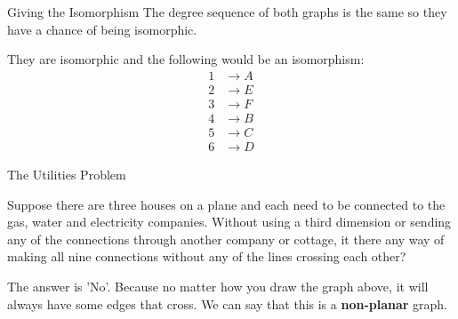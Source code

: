 \documentclass[8pt]{beamer}
\begin{document}
\begin{frame}{Giving the Isomorphism}
The degree sequence of both graphs is the same so they have a chance of being isomorphic.

They are isomorphic and the following would be an isomorphism:
\begin{align*}
	1 &\rightarrow A \\
	2 &\rightarrow E \\
	3 &\rightarrow F \\
	4 &\rightarrow B \\
	5 &\rightarrow C \\
	6 &\rightarrow D	
\end{align*}
\end{frame}

\begin{frame}{The Utilities Problem}
	\begin{Problem}
		Suppose there are three houses on a plane and each need to be connected to the gas, water and electricity companies. Without using a third dimension or sending any of the connections through another company or cottage, it there any way of making all nine connections without any of the lines crossing each other?

	\end{Problem}

	The answer is 'No'. Because no matter how you draw the graph above, it will always have some edges that cross. We can say that this is a \textbf{non-planar} graph. 
	
\end{frame}
\end{document}
